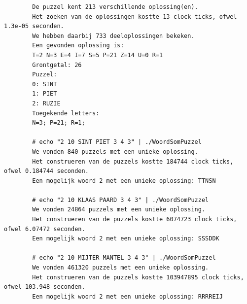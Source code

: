 \documentclass[twocolumn,10pt]{article}
\begin{document}
\begin{appendices}
\begin{lstlisting}
        De puzzel kent 213 verschillende oplossing(en).
        Het zoeken van de oplossingen kostte 13 clock ticks, ofwel 1.3e-05 seconden.
        We hebben daarbij 733 deeloplossingen bekeken.
        Een gevonden oplossing is:
        T=2 N=3 E=4 I=7 S=5 P=21 Z=14 U=0 R=1
        Grontgetal: 26 
        Puzzel:
        0: SINT
        1: PIET
        2: RUZIE
        Toegekende letters:
        N=3; P=21; R=1; 

        # echo "2 10 SINT PIET 3 4 3" | ./WoordSomPuzzel
        We vonden 840 puzzels met een unieke oplossing.
        Het construeren van de puzzels kostte 184744 clock ticks, ofwel 0.184744 seconden.
        Een mogelijk woord 2 met een unieke oplossing: TTNSN

        # echo "2 10 KLAAS PAARD 3 4 3" | ./WoordSomPuzzel
        We vonden 24864 puzzels met een unieke oplossing.
        Het construeren van de puzzels kostte 6074723 clock ticks, ofwel 6.07472 seconden.
        Een mogelijk woord 2 met een unieke oplossing: SSSDDK

        # echo "2 10 MIJTER MANTEL 3 4 3" | ./WoordSomPuzzel 
        We vonden 461320 puzzels met een unieke oplossing.
        Het construeren van de puzzels kostte 103947895 clock ticks, ofwel 103.948 seconden.
        Een mogelijk woord 2 met een unieke oplossing: RRRREIJ

        
    \end{lstlisting}
 

\end{appendices}
\end{document}
